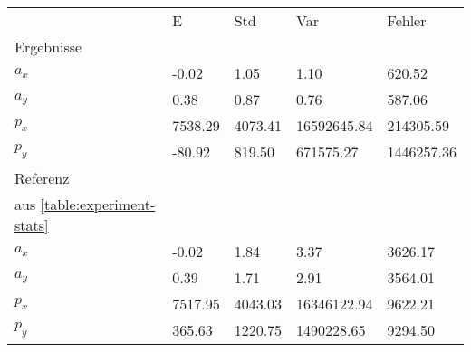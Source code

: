\begin{tabular}{l|l|l|l|l}

     & E   & Std    & Var    & Fehler \\
\hhline{=|=|=|=|=}

Ergebnisse & & & & \\
$a_x$  &        -0.02 &         1.05 &         1.10 &       620.52 \\
$a_y$  &         0.38 &         0.87 &         0.76 &       587.06 \\
$p_x$  &      7538.29 &      4073.41 &  16592645.84 &    214305.59 \\
$p_y$  &       -80.92 &       819.50 &    671575.27 &   1446257.36 \\

\hline
Referenz & & & & \\
aus \ref{table:experiment-stats} & & & & \\
$a_x$  &        -0.02 &         1.84 &         3.37 &      3626.17 \\
$a_y$  &         0.39 &         1.71 &         2.91 &      3564.01 \\
$p_x$  &      7517.95 &      4043.03 &  16346122.94 &      9622.21 \\
$p_y$  &       365.63 &      1220.75 &   1490228.65 &      9294.50 \\
\end{tabular}

